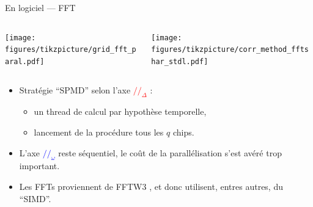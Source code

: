 \documentclass[../main.tex]{subfiles}
\begin{document}
\begin{frame}{En logiciel --- FFT}
  \begin{columns}
    \begin{column}{.4\linewidth} \centering
      \texttt{[image: figures/tikzpicture/grid\_fft\_paral.pdf]}
    \end{column}
    \begin{column}{.5 \linewidth}
      \centering
      \texttt{[image: figures/tikzpicture/corr\_method\_fftshar\_stdl.pdf]}
    \end{column}
  \end{columns}
  \begin{columns}
    \begin{column}{.9\linewidth} \centering
      \begin{itemize}
        \item Stratégie ``SPMD'' selon l'axe \textcolor{Red}{$//_{\Delta}$} :
              \begin{itemize}
                \item un thread de calcul par hypothèse temporelle,
                \item lancement de la procédure tous les $q$ chips.
              \end{itemize}
        \item L'axe \textcolor{Blue}{$//_{\omega}$} reste séquentiel, le coût de la parallélisation s'est avéré trop important.
        \item Les FFTs proviennent de FFTW3 \cite{frigoDesignImplementationFFTW32005a}, et donc utilisent, entres autres, du ``SIMD''.
      \end{itemize}
    \end{column}
  \end{columns}
\end{frame}
\end{document}
